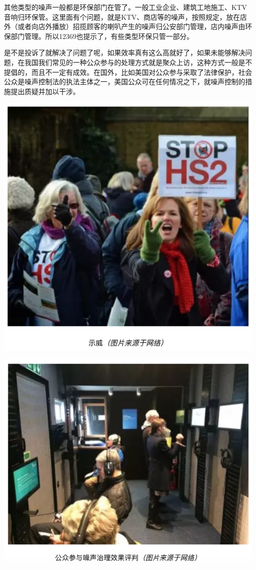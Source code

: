 \documentclass[
]{book}
\begin{document}
其他类型的噪声一般都是环保部门在管了。一般工业企业、建筑工地施工、KTV音响归环保管。这里面有个问题，就是KTV、商店等的噪声，按照规定，放在店外（或者向店外播放）招揽顾客的喇叭产生的噪声归公安部门管理，店内噪声由环保部门管理。所以12369也提示了，有些类型环保只管一部分。

是不是投诉了就解决了问题了呢，如果效率真有这么高就好了，如果未能够解决问题，在我国我们常见的一种公众参与的处理方式就是聚众上访，这种方式一般是不提倡的，而且不一定有成效。在国外，比如美国对公众参与采取了法律保护，社会公众是噪声控制法的执法主体之一，美国公众可在任何情况之下，就噪声控制的措施提出质疑并加以干涉。

\includegraphics[width=8.33in]{images/zaosheng4}

\includegraphics[width=8.33in]{images/zaosheng5}
\end{document}
